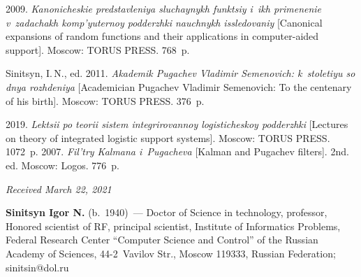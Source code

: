 \begin{multicols}{2}
{{\begin{thebibliography}{99}
 2009. \textit{Kanonicheskie predstavleniya sluchaynykh funktsiy i~ikh primenenie 
v~zadachakh komp'yuternoy podderzhki nauchnykh issledovaniy} [Canonical expansions of random 
functions and their applications in computer-aided support]. Moscow: TORUS PRESS. 768~p.

Sinitsyn, I.\,N., ed. 2011. \textit{Akademik Pugachev Vladimir Semenovich: k~stoletiyu so dnya rozhdeniya} 
[Academician Pugachev Vladimir Semenovich: To the centenary of his birth]. Moscow: TORUS PRESS. 376~p.

 2019. \textit{Lektsii po teorii sistem integrirovannoy logisticheskoy podderzhki} 
 [Lectures on theory of integrated logistic support systems]. Moscow: TORUS PRESS. 1072~p.
 2007. \textit{Fil'try Kalmana i~Pugacheva} [Kalman and Pugachev filters]. 2nd. ed. Moscow: Logos. 776~p.
 \end{thebibliography}

 }
 }

\end{multicols}

\vspace*{-9pt}

\hfill{\small\textit{Received March 22, 2021}}


\vspace*{-18pt}

\Contrl

\vspace*{-3pt}

\noindent
\textbf{Sinitsyn Igor N.} (b.\ 1940)~--- 
Doctor of Science in technology, professor, Honored scientist of RF, principal scientist, 
Institute of Informatics Problems, Federal Research Center ``Computer Science and Control'' 
of the Russian Academy of Sciences, 44-2~Vavilov Str., Moscow 119333, Russian Federation; \mbox{sinitsin@dol.ru}




\label{end\stat}

\renewcommand{\bibname}{\protect\rm Литература} 